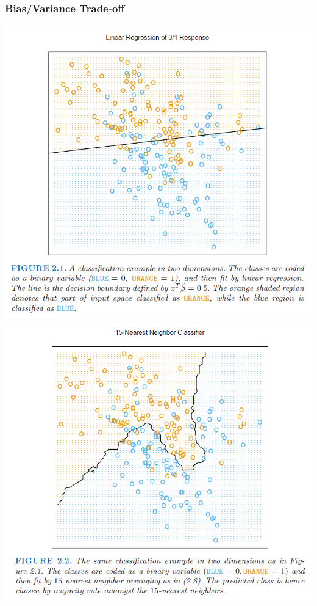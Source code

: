 \documentclass[hide notes,red,handout]{beamer}
\begin{document}
\begin{frame}[t]
\frametitle{Bias/Variance Trade-off}
\begin{center}
\includegraphics[scale=0.27]{biasslr}\includegraphics[scale=0.27]{knn}
\end{center}
\end{frame}
\end{document}

